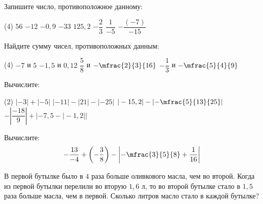 \begin{homework}[number=2]
	\begin{listofex}
		\item Запишите число, противоположное данному:
		\begin{tasks}(4)
			\task \( 56  \)
			\task \( -12 \)
			\task \( -0,9 \)
			\task \( -33 \)
			\task \( 125,2 \)
			\task \( -\dfrac{2}{3} \)
			\task \( \dfrac{1}{-5} \)
			\task \( -\dfrac{(-7)}{-15} \)
		\end{tasks}
		\item Найдите сумму чисел, противоположных данным:
		\begin{tasks}(4)
			\task \( -7  \) и \( 5 \)
			\task \( -1,5  \) и \( 0,12 \)
			\task \( \dfrac{5}{8}  \) и \( -\mfrac{2}{3}{16} \)
			\task \( -\dfrac{1}{3}  \) и \( -\mfrac{5}{4}{9} \)
		\end{tasks}
		\item Вычислите:
		\begin{tasks}(2)
			\task \(  |-3|+|-5| \)
			\task \( |-11|-|21|-|-25|  \)
			\task \(  |-15,2|-\left|-\mfrac{5}{13}{25}\right| \)
			\task \(  -\left|\dfrac{-18}{9}\right| + |-7,5-|-1,2|| \)
		\end{tasks}
		\item Вычислите: \[ -\dfrac{13}{-4} + \left(-\dfrac{3}{8}\right) - \left|-\mfrac{3}{5}{8}+\dfrac{1}{16}\right| \]
		\item В первой бутылке было в \(4\) раза больше оливкового масла, чем во второй. Когда из первой бутылки перелили во вторую \(1,6\) л, то во второй бутылке стало в \(1,5\) раза больше масла, чем в первой. Сколько литров масло стало в каждой бутылке?
	\end{listofex}
\end{homework}

